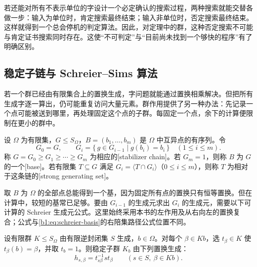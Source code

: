 \ProseParagraphBreak
若还能对所有不表示单位的字设计一个必定确认的搜索过程，两种搜索就能交替各做一步：输入为单位时，肯定搜索最终结束；输入非单位时，否定搜索最终结束。这样就得到一个总会停机的判定算法。因此，对定理中的群，这种否定搜索不可能与肯定证书搜索同时存在。这使“不可判定”与“目前尚未找到一个够快的程序”有了明确区别。

\subsection{稳定子链与 Schreier–Sims 算法}
\label{b1:subsec:C03:04}

若一个群已经由有限集合上的置换生成，字问题就能通过置换相乘解决。但把所有生成字逐一算出，仍可能重复访问大量元素。群作用提供了另一种办法：先记录一个点可能被送到哪里，再处理固定这个点的子群。每固定一个点，余下的计算便限制在更小的群中。

\begin{definition}\label{b1:def:C-stabilizer-chain}
	设 \(\Omega\) 为有限集，\(G\leq S_\Omega\)，\(B=(b_1,\ldots,b_m)\) 是 \(\Omega\) 中互异点的有序列。令
	\[
		G_0=G,\qquad G_i=\{\,g\in G_{i-1}\mid g(b_i)=b_i\,\}\quad(1\leq i\leq m).
	\]
	称 \(G=G_0\geq G_1\geq\cdots\geq G_m\) 为相应的[stabilizer chain]。若 \(G_m=1\)，则称 \(B\) 为 \(G\) 的一个[base]。若有限集 \(T\subseteq G\) 满足 \(G_i=\langle T\cap G_i\rangle\)（\(0\leq i\leq m\)），则称 \(T\) 为相对于这条链的[strong generating set]。
\end{definition}

取 \(B\) 为 \(\Omega\) 的全部点总能得到一个基，因为固定所有点的置换只有恒等置换。但在计算中，较短的基常已足够。要由 \(G_{i-1}\) 的生成元求出 \(G_i\) 的生成元，需要以下可计算的 Schreier 生成元公式。这里始终采用本书的左作用及从右向左的置换复合；公式与\eqref{b1:eq:schreier-basis}的右陪集路径公式位置不同。

\begin{lemma}\label{b1:lem:C-schreier-generators}
	设有限群 \(K\leq S_\Omega\) 由有限逆封闭集 \(S\) 生成，\(b\in\Omega\)。对每个 \(\beta\in Kb\)，选 \(t_\beta\in K\) 使 \(t_\beta(b)=\beta\)，并取 \(t_b=1\)。则稳定子群 \(K_b\) 由下列置换生成：
	\begin{equation}\label{b1:eq:C-schreier-generators}
		h_{s,\beta}=t_{s\beta}^{-1}s t_\beta
		\qquad(s\in S,\ \beta\in Kb).
	\end{equation}
\end{lemma}

